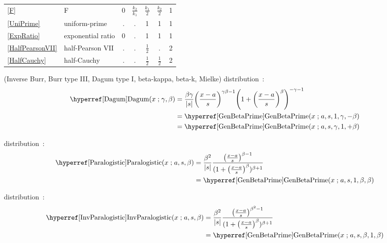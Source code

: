 \begin{table*}[tp]
\begin{center}
{\begin{tabular}{llccccc}
\eqref{F} & F	&  0 &  $\tfrac{k_2}{k_1}$ & $\tfrac{k_1}{2}$ & $\tfrac{k_2}{2}$   &    1     \\
\eqref{UniPrime} & uniform-prime	& . & . & 1 & 1 & 1  \\
\eqref{ExpRatio} & exponential ratio		& 0 & . & 1 & 1 & 1  \\
\eqref{HalfPearsonVII} & half-Pearson  VII	&  . &  .  &   $\tfrac{1}{2}$ & .   &    2     \\
\eqref{HalfCauchy} & half-Cauchy	&  . &  . & $\tfrac{1}{2}$ & $\tfrac{1}{2}$   &    2     \\
\end{tabular} 
}
\end{center}
\end{table*}




\pagebreak
{} (Inverse Burr, Burr type III, Dagum type I,  beta-kappa, beta-k, Mielke) distribution~\cite{Burr1942, Dagum1977, Tadikamalla1980}:
\begin{align}
\label{Dagum}
\opr{Dagum}(x\given  \gamma,\beta) 
&=  \frac{\beta \gamma}{|s|} \Left(\frac{x-a}{s}\Right)^{\gamma \beta-1}  \Left(1+\Left(\frac{x-a}{s}\Right)^\beta\Right)^{-\gamma-1} 
\checked
\\ \notag &= \opr{GenBetaPrime}(x\given a, s, 1, \gamma,-\beta) \checked
\\ \notag &= \opr{GenBetaPrime}(x\given a, s, \gamma,1,+\beta) \checked
\end{align}

 distribution~\cite{Kleiber2003}:
\begin{align}
\label{Paralogistic}
\opr{Paralogistic}(x\given a, s, \beta) &= \frac{\beta^2}{|s|} \frac{ \Left(\frac{x-a}{s}\Right)^{\beta-1}}{ (1+ \Left(\frac{x-a}{s}\Right)^\beta)^{\beta+1} } \checked
\\ \notag &= \opr{GenBetaPrime}(x\given a, s, 1,\beta,\beta)
\checked
\end{align}


 distribution~\cite{Klugman2012}:
\begin{align}
\label{InvParalogistic}
\opr{InvParalogistic}(x\given a,s,\beta) &= \frac{\beta^2}{|s|}  \frac{ \Left(\frac{x-a}{s}\Right)^{\beta^2-1}}{ (1+ \Left(\frac{x-a}{s}\Right)^\beta)^{\beta+1} } \checked
\\ \notag &= \opr{GenBetaPrime}(x\given a, s, \beta,1,\beta) \checked
\end{align}





